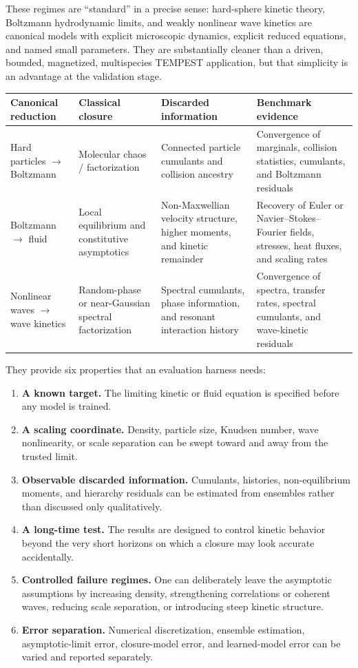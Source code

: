 \documentclass[11pt]{article}
\begin{document}
These regimes are ``standard'' in a precise sense: hard-sphere kinetic theory, Boltzmann hydrodynamic limits, and weakly nonlinear wave kinetics are canonical models with explicit microscopic dynamics, explicit reduced equations, and named small parameters. They are substantially cleaner than a driven, bounded, magnetized, multispecies TEMPEST application, but that simplicity is an advantage at the validation stage.

\begin{center}
\begin{tabularx}{\textwidth}{@{}P{0.19\textwidth}P{0.21\textwidth}P{0.24\textwidth}Y@{}}
\toprule
\textbf{Canonical reduction} & \textbf{Classical closure} & \textbf{Discarded information} & \textbf{Benchmark evidence} \\
\midrule
Hard particles $\to$ Boltzmann & Molecular chaos / factorization & Connected particle cumulants and collision ancestry & Convergence of marginals, collision statistics, cumulants, and Boltzmann residuals \\
Boltzmann $\to$ fluid & Local equilibrium and constitutive asymptotics & Non-Maxwellian velocity structure, higher moments, and kinetic remainder & Recovery of Euler or Navier--Stokes--Fourier fields, stresses, heat fluxes, and scaling rates \\
Nonlinear waves $\to$ wave kinetics & Random-phase or near-Gaussian spectral factorization & Spectral cumulants, phase information, and resonant interaction history & Convergence of spectra, transfer rates, spectral cumulants, and wave-kinetic residuals \\
\bottomrule
\end{tabularx}
\end{center}

They provide six properties that an evaluation harness needs:
\begin{enumerate}
  \item \textbf{A known target.} The limiting kinetic or fluid equation is specified before any model is trained.
  \item \textbf{A scaling coordinate.} Density, particle size, Knudsen number, wave nonlinearity, or scale separation can be swept toward and away from the trusted limit.
  \item \textbf{Observable discarded information.} Cumulants, histories, non-equilibrium moments, and hierarchy residuals can be estimated from ensembles rather than discussed only qualitatively.
  \item \textbf{A long-time test.} The results are designed to control kinetic behavior beyond the very short horizons on which a closure may look accurate accidentally.
  \item \textbf{Controlled failure regimes.} One can deliberately leave the asymptotic assumptions by increasing density, strengthening correlations or coherent waves, reducing scale separation, or introducing steep kinetic structure.
  \item \textbf{Error separation.} Numerical discretization, ensemble estimation, asymptotic-limit error, closure-model error, and learned-model error can be varied and reported separately.
\end{enumerate}
\end{document}
